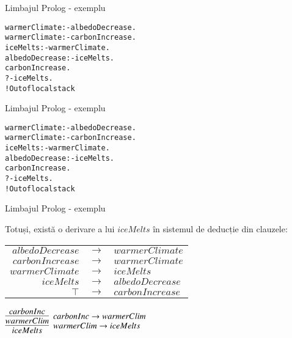 \documentclass[xcolor=pdftex,romanian,colorlinks]{beamer}
\begin{document}
\begin{frame}{Limbajul Prolog - exemplu}

\begin{alltt}
warmerClimate :- albedoDecrease. \\
warmerClimate :- carbonIncrease. \\
iceMelts :- warmerClimate. \\
albedoDecrease :- iceMelts. \\
carbonIncrease. \\

?- iceMelts.\\
\alert{! Out of local stack}
\end{alltt}

\end{frame}


\begin{frame}{Limbajul Prolog - exemplu}

\begin{alltt}
\alert{warmerClimate} :- \alert{albedoDecrease.} \\
warmerClimate :- carbonIncrease. \\
\alert{iceMelts} :- \alert{warmerClimate}. \\
\alert{albedoDecrease} :- \alert{iceMelts.} \\
carbonIncrease. \\

?- iceMelts.\\
\alert{! Out of local stack}
\end{alltt}

\end{frame}

\begin{frame}{Limbajul Prolog - exemplu}

Totuși, există o derivare a lui $iceMelts$ în sistemul de deducție din clauzele:
\begin{center}
\begin{tabular}{rcl}

$albedoDecrease$ & $\to$ & $warmerClimate  $ \\
$carbonIncrease$ & $\to$ & $warmerClimate $ \\
$warmerClimate$ & $\to$ & $iceMelts$  \\
$iceMelts$ & $\to$ & $albedoDecrease$ \\
$\top$&$\to$ & $carbonIncrease $ \\

\end{tabular}

\bigskip
$
\infer[warmerClim \to iceMelts]
  {iceMelts}{\infer[carbonInc \to warmerClim]
  {warmerClim}{carbonInc}
  }
$
\end{center}

\end{frame}
\end{document}
